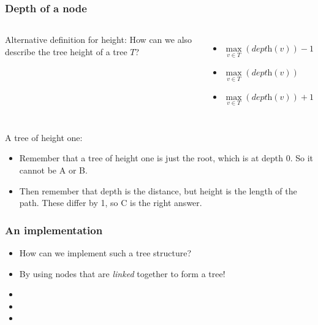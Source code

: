 \begin{frame}
	\frametitle{Depth of a node}

	\begin{columns}[T]
		Alternative definition for height: How can we also describe the tree height of a tree $T$?
			
			\begin{itemize}
				\item $\max\limits_{v\in T}({\textit{depth}(v)})-1$
				\item $\max\limits_{v\in T}({\textit{depth}(v)})$
				\item $\max\limits_{v\in T}({\textit{depth}(v)})+1$
			\end{itemize}
	\end{columns}
	
	A tree of height one:
	
			\begin{itemize}
				\item Remember that a tree of height one is just the root, which is at depth $0$. So it cannot be A or B.
				\item Then remember that depth is the distance, but height is the length of the path. These differ by 1, so C is the right answer.
			\end{itemize}
				
\end{frame}


\begin{frame}
	\frametitle{An implementation}
	
		\begin{itemize}
				\item How can we implement such a tree structure?
				\item By using nodes that are \textit{linked} together to form a tree!
	\end{itemize}
	
		
			\begin{itemize}
			\item 
			\item 
			\item 
			\end{itemize}
\end{frame}

